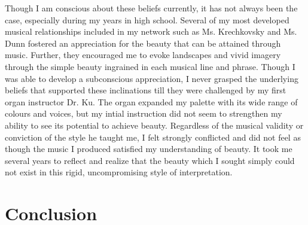 \documentclass{article} %
\begin{document}
\begin{multicols}{2}
Though I am conscious about these beliefs currently, it has not always been the case, especially during my years in high school.
Several of my most developed musical relationships included in my network such as Ms. Krechkovsky and Ms. Dunn fostered an appreciation for the beauty that can be attained through music.
Further, they encouraged me to evoke landscapes and vivid imagery through the simple beauty ingrained in each musical line and phrase.
Though I was able to develop a subconscious appreciation, I never grasped the underlying beliefs that supported these inclinations till they were challenged by my first organ instructor Dr. Ku.
The organ expanded my palette with its wide range of colours and voices, but my intial instruction did not seem to strengthen my ability to see its potential to achieve beauty.
Regardless of the musical validity or conviction of the style he taught me, I felt strongly conflicted and did not feel as though the music I produced satisfied my understanding of beauty.
It took me several years to reflect and realize that the beauty which I sought simply could not exist in this rigid, uncompromising style of interpretation.


\section{Conclusion}



%
%

\end{multicols}

\label{last_page}
\end{document}
